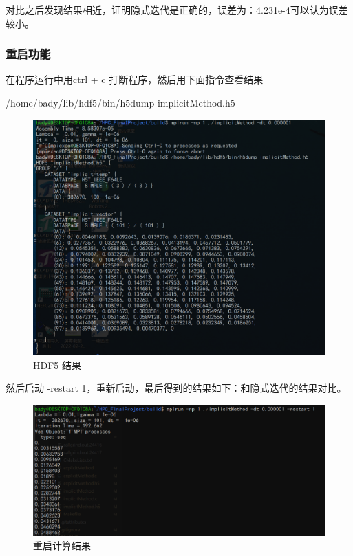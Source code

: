 \documentclass[10pt, a4paper]{article}
\begin{document}
对比之后发现结果相近，证明隐式迭代是正确的，误差为：4.231e-4可以认为误差较小。

\subsubsection{重启功能}
在程序运行中用ctrl + c 打断程序，然后用下面指令查看结果

/home/bady/lib/hdf5/bin/h5dump implicitMethod.h5

\begin{figure}[!h]
\centering
\includegraphics[scale=0.3]{img/restart1.png}
\caption{HDF5 结果}
\label{fig:1}
\end{figure}

然后启动 -restart 1，重新启动，最后得到的结果如下：和隐式迭代的结果对比。

\begin{figure}[!h]
\centering
\includegraphics[scale=0.3]{img/restart2.png}
\caption{重启计算结果}
\label{fig:1}
\end{figure}
\end{document}
